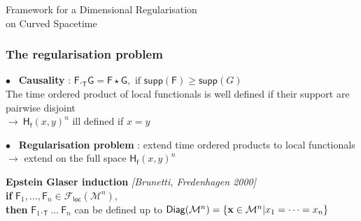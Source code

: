 \documentclass[9pt]{beamer}
\newcommand{\supp}{\mathsf{supp}}
\newcommand{\citebeam}[1]{\textit{\textcolor{black!60!white}{[#1]}}}
\newcommand{\Fcal}{\mathcal{F}}
\newcommand{\Mcal}{\mathcal{M}}
\newcommand{\Fsf}{\mathsf{F}}
\newcommand{\Gsf}{\mathsf{G}}
\newcommand{\Hsf}{\mathsf{H}}
\newcommand{\Tsf}{\mathsf{T}}
\newcommand{\fsf}{\mathsf{f}}
\begin{document}


{%
%
%
%
\begin{frame}%
\bf
\vspace*{30pt}
%
\begin{exampleblock}{\vspace*{-3ex}}%
%
\begin{center}%
%
\Large Framework for a Dimensional Regularisation \\[10pt] on Curved Spacetime
%
\end{center}%
%
\end{exampleblock}%
%
\end{frame}
%
}%






\begin{frame}

\frametitle{The regularisation problem}

\vfill

$\bullet$ \ \textbf{Causality} : \quad $\Fsf ._\Tsf \Gsf = \Fsf \star \Gsf, \mbox{ if } \supp(\Fsf) \geq \supp(G)$ \\
\hspace*{8pt} The time ordered product of local functionals is well defined if their support \hspace*{8pt} are pairwise disjoint \\

\hspace*{8pt} $\to \ \Hsf_\fsf(x,y)^n$  ill defined if $x=y$ \\

\vfill 

$\bullet$ \ \textbf{Regularisation problem} : extend time ordered products to local functionals \\
\hspace*{8pt} $\to$ extend on the full space $\Hsf_\fsf(x,y)^n$

\vspace*{-6pt}

\begin{block}{}
\vspace*{-2ex}
\textbf{Epstein Glaser induction} \citebeam{Brunetti, Fredenhagen 2000}  \\
\textbf{if} $\Fsf_1, \dots, \Fsf_n \in \Fcal_\mathsf{loc}(\Mcal^n)$, \\
\textbf{then} $\Fsf_1 ._\Tsf \ \dots \ \Fsf_n$ can be defined up to $\mathsf{Diag}(\Mcal^n)=\{{\bf x}\in \Mcal^n  | x_1 = \dots = x_n\}$ \\[5pt]
\vspace*{-1ex}
\end{block}



\vfill

\end{frame}
\end{document}
